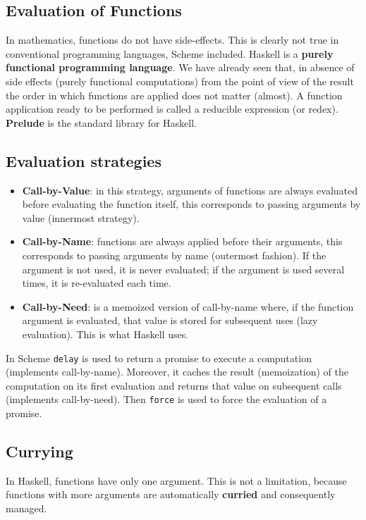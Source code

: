 \subsection{Evaluation of Functions}
In mathematics, functions do not have side-effects.
This is clearly not true in conventional programming languages, Scheme included.
Haskell is a \textbf{purely functional programming language}.
We have already seen that, in absence of side effects (purely functional computations) from the point of view of the result the order in which functions are applied does not matter (almost).
A function application ready to be performed is called a reducible expression (or redex).\\
\textbf{Prelude} is the standard library for Haskell.
\subsection{Evaluation strategies}
\begin{itemize}
	\item \textbf{Call-by-Value}: in this strategy, arguments of functions are always evaluated before evaluating the function itself, this corresponds to passing arguments by value (innermost strategy).
	\item \textbf{Call-by-Name}: functions are always applied before their arguments, this corresponds to passing arguments by name (outermost fashion).
	If the argument is not used, it is never evaluated; if the argument is used several times, it is re-evaluated each time.
	\item \textbf{Call-by-Need}: is a memoized version of call-by-name where, if the function argument is evaluated, that value is stored for subsequent uses (lazy evaluation).
	This is what Haskell uses.
\end{itemize}
In Scheme \texttt{delay} is used to return a promise to execute a computation (implements call-by-name).
Moreover, it caches the result (memoization) of the computation on its first evaluation and returns that value on subsequent calls (implements call-by-need).
Then \texttt{force} is used to force the evaluation of a promise.

\subsection{Currying}
In Haskell, functions have only one argument.
This is not a limitation, because functions with more arguments are automatically \textbf{curried} and consequently managed.

